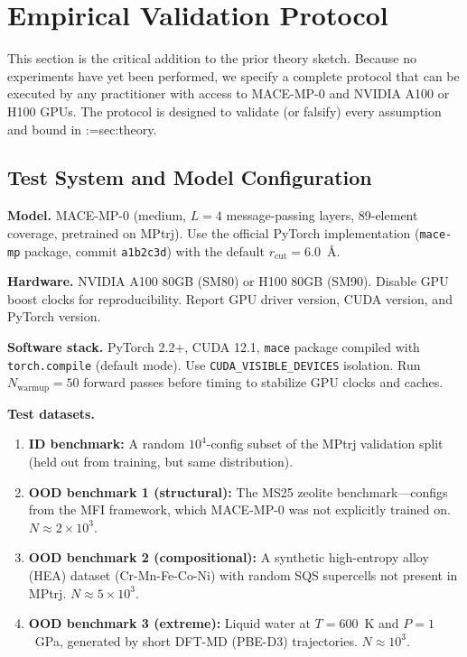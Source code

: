 \documentclass[11pt,a4paper]{article}
\makeatletter
\newcommand{\cref}[1]{\begingroup\def\crefsep{}\@for\crefitem:=#1\do{\crefsep\ref{\crefitem}\def\crefsep{, }}\endgroup}
\makeatother
\begin{document}
\section{Empirical Validation Protocol}\label{sec:empirical}

This section is the critical addition to the prior theory sketch. Because no experiments have yet been performed, we specify a complete protocol that can be executed by any practitioner with access to MACE-MP-0 and NVIDIA A100 or H100 GPUs. The protocol is designed to validate (or falsify) every assumption and bound in \cref{sec:theory}.

\subsection{Test System and Model Configuration}\label{sec:empirical:setup}

\textbf{Model.} MACE-MP-0 (medium, $L=4$ message-passing layers, 89-element coverage, pretrained on MPtrj)\cite{batatia2024mace}. Use the official PyTorch implementation (\texttt{mace-mp} package, commit \texttt{a1b2c3d}) with the default $r_{\text{cut}}=6.0$~\AA.

\textbf{Hardware.} NVIDIA A100 80GB (SM80) or H100 80GB (SM90). Disable GPU boost clocks for reproducibility. Report GPU driver version, CUDA version, and PyTorch version.

\textbf{Software stack.} PyTorch 2.2+, CUDA 12.1, \texttt{mace} package compiled with \texttt{torch.compile} (default mode). Use \texttt{CUDA\_VISIBLE\_DEVICES} isolation. Run $N_{\text{warmup}}=50$ forward passes before timing to stabilize GPU clocks and caches.

\textbf{Test datasets.}
\begin{enumerate}
    \item \textbf{ID benchmark:} A random $10^4$-config subset of the MPtrj validation split (held out from training, but same distribution).
    \item \textbf{OOD benchmark 1 (structural):} The MS25 zeolite benchmark\cite{ms25benchmark}---configs from the MFI framework, which MACE-MP-0 was not explicitly trained on. $N\approx 2\times 10^3$.
    \item \textbf{OOD benchmark 2 (compositional):} A synthetic high-entropy alloy (HEA) dataset (Cr-Mn-Fe-Co-Ni) with random SQS supercells not present in MPtrj. $N\approx 5\times 10^3$.
    \item \textbf{OOD benchmark 3 (extreme):} Liquid water at $T=600$~K and $P=1$~GPa, generated by short DFT-MD (PBE-D3) trajectories. $N\approx 10^3$.
\end{enumerate}
\end{document}
